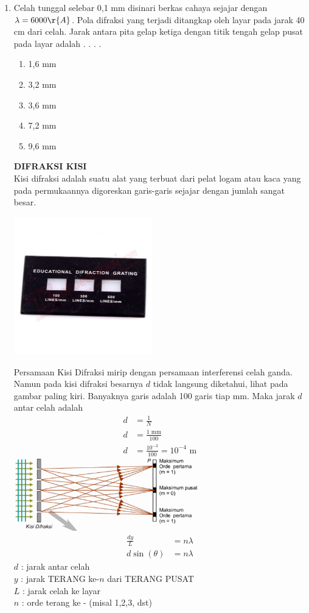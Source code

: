 \documentclass[11pt,a4paper]{extarticle}
\newcommand{\pilgani}[1]{                            \vspace{-0.3cm}\begin{multicols}{2}
 \begin{enumerate}[label=\Alph*., itemsep=0pt,topsep=0pt,leftmargin=*,align=Center]#1                     \end{enumerate}
 \phantom{ini cuma sapi, wedus, dan ayam}
 \end{multicols}}
\begin{document}
\begin{multicols*}{2}
\begin{enumerate}
\item Celah tunggal selebar 0,1 mm disinari berkas cahaya sejajar dengan $\lambda = 6000 \r{A}$. Pola difraksi yang terjadi ditangkap oleh layar pada jarak 40 cm dari celah. Jarak antara pita gelap ketiga dengan titik tengah gelap pusat pada layar adalah . . . .
\pilgani{
        \item 1,6 mm
        \item 3,2 mm
        \item 3,6 mm
        \item 7,2 mm
        \item 9,6 mm
        }

\vspace{3cm}

\textbf{DIFRAKSI KISI}\\
Kisi difraksi adalah suatu alat yang terbuat dari pelat logam atau kaca yang pada permukaannya digoreskan garis-garis sejajar dengan jumlah sangat besar.

\includegraphics[width=6cm]{pic/kisi2}

Persamaan Kisi Difraksi mirip dengan persamaan interferensi celah ganda. Namun pada kisi difraksi besarnya $d$ tidak langsung diketahui, lihat pada gambar paling kiri. Banyaknya garis adalah 100 garis tiap mm. Maka jarak $d$ antar celah adalah
\begin{align*}
d &= \frac{1}{N}\\
d &=\frac{1 \text{ mm}}{100}\\
d &=\frac{ 10^{-3}}{100}=10^{-4}\text{ m}
\end{align*}
\includegraphics[width=8cm]{pic/kisi}\\
\begin{align*}
\frac{dy}{L} &= n \lambda\\
d \sin (\theta) &= n \lambda
\end{align*}
$d$ : jarak antar celah\\
$y$ : jarak TERANG ke-$n$ dari TERANG PUSAT\\
$L$ : jarak celah ke layar\\ 
$n$ : orde terang ke - (misal 1,2,3, dst)\\



\end{enumerate}
\end{multicols*}
\end{document}
